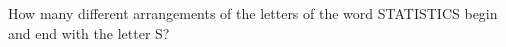 How many different arrangements of the letters of the word STATISTICS begin and end with the letter S?
